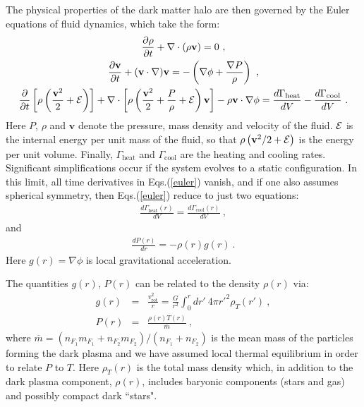 \documentclass[12pt]{article}
\begin{document}
{{The physical properties of the dark matter halo are then governed by the Euler equations of fluid dynamics, which take the form:
%
\begin{gather}
\frac{\partial \rho}{\partial t} + \nabla \cdot (\rho \mathbf{v}) = 0 \nonumber \ , \\
\frac{\partial \mathbf{v}}{\partial t} + (\mathbf{v} \cdot \nabla)\mathbf{v} = -\left ( \nabla \phi + \frac{\nabla P}{\rho} \right) \nonumber \ , \\
\frac{\partial}{\partial t} \left [\rho \left ( \frac{\mathbf{v}^2}{2} + {\cal E} \right ) \right ] + \nabla \cdot \left [\rho \left ( \frac{\mathbf{v}^2}{2} + \frac{P}{\rho} + {\cal E} \right ) \mathbf{v} \right ] - \rho \mathbf{v} \cdot \nabla \phi = \frac{d\Gamma _{\text{heat}}}{dV} - \frac{d\Gamma _{\text{cool}}}{dV} \ .
\label{euler}
\end{gather}
%
Here $P$, $\rho$ and $\mathbf{v}$ denote the pressure, mass density and velocity of the fluid. ${\cal E}$ is the internal energy per unit mass of the fluid, so that $\rho \left (\mathbf{v}^2/2 + {\cal E} \right )$ is the energy per unit volume. Finally, $\Gamma _{\text{heat}}$ and $\Gamma _{\text{cool}}$ are the heating and cooling rates. Significant simplifications occur if the system evolves to a static configuration. In this limit, all time derivatives in Eqs.(\ref{euler}) vanish, and if one also assumes spherical symmetry, then Eqs.(\ref{euler}) reduce to just two equations:
%
\begin{eqnarray}
\frac{d\Gamma _{\text{heat}}(r)}{dV} = \frac{d\Gamma _{\text{cool}}(r)}{dV} \ ,
\label{balance}
\end{eqnarray}
%
and
%
\begin{eqnarray}
\frac{dP(r)}{dr} = -\rho (r)g(r) \ .
\label{hydrostatic}
\end{eqnarray}
%
Here $g(r)=\nabla \phi$ is local gravitational acceleration.

The quantities $g(r)$, $P(r)$ can be related to the density $\rho (r)$ via:
%
\begin{eqnarray}
g(r) &=& \frac{v _{\text{rot}} ^2}{r} = \frac{G}{r ^2} \int _0 ^r dr' \ 4\pi {r'} ^2 \rho _T (r') \ , \nonumber \\
P(r) &=& \frac{\rho(r)T(r)}{\overline{m}} \ ,
\label{grhop}
\end{eqnarray}
%
where $\overline{m} = (n _{F_1}m _{F_1} + n _{F_2}m _{F_2})/(n _{F_1} + n _{F_2})$ is the mean mass of the particles forming the dark plasma and we have assumed local thermal equilibrium in order to relate $P$ to $T$. Here $\rho _T (r)$ is the total mass density which, in addition to the dark plasma component, $\rho (r)$, includes baryonic components (stars and gas) and possibly compact dark ``stars".

}}
\end{document}
